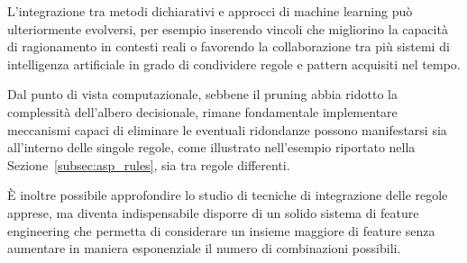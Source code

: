 L’integrazione tra metodi dichiarativi e approcci di machine learning può ulteriormente evolversi, per esempio inserendo vincoli che migliorino la capacità di ragionamento in contesti reali o favorendo la collaborazione tra più sistemi di intelligenza artificiale in grado di condividere regole e pattern acquisiti nel tempo.

Dal punto di vista computazionale, sebbene il pruning abbia ridotto la complessità dell'albero decisionale, rimane fondamentale implementare meccanismi capaci di eliminare le eventuali ridondanze possono manifestarsi sia all’interno delle singole regole, come illustrato nell'esempio riportato nella Sezione~\ref{subsec:asp_rules}, sia tra regole differenti. 

È inoltre possibile approfondire lo studio di tecniche di integrazione delle regole apprese, ma diventa indispensabile disporre di un solido sistema di feature engineering che permetta di considerare un insieme maggiore di feature senza aumentare in maniera esponenziale il numero di combinazioni possibili.